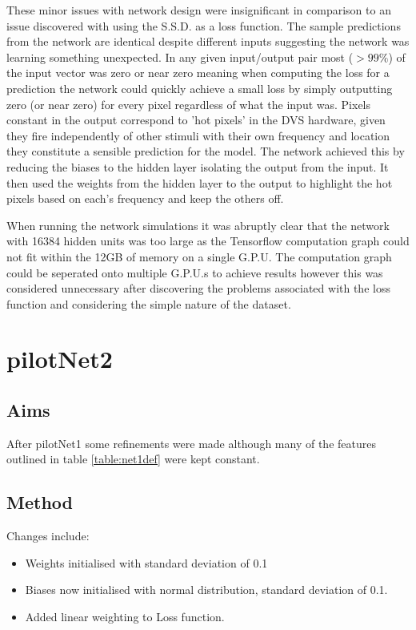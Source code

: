 These minor issues with network design were insignificant in comparison to an issue discovered with using the S.S.D. as a loss function. 
The sample predictions from the network are identical despite different inputs suggesting the network was learning something unexpected.
In any given input/output pair most ($>99\%$) of the input vector was zero or near zero meaning when computing the loss for a prediction the network could quickly achieve a small loss by simply outputting zero (or near zero) for every pixel regardless of what the input was. 
Pixels constant in the output correspond to 'hot pixels' in the DVS hardware, given they fire independently of other stimuli with their own frequency and location they constitute a sensible prediction for the model. 
The network achieved this by reducing the biases to the hidden layer isolating the output from the input.
It then used the weights from the hidden layer to the output to highlight the hot pixels based on each's frequency and keep the others off. 


When running the network simulations it was abruptly clear that the network with 16384 hidden units was too large as the Tensorflow computation graph could not fit within the 12GB of memory on a single G.P.U.
The computation graph could be seperated onto multiple G.P.U.s to achieve results however this was considered unnecessary after discovering the problems associated with the loss function and considering the simple nature of the dataset.




\section{pilotNet2}

\subsection{Aims}

After pilotNet1 some refinements were made although many of the features outlined in table \ref{table:net1def} were kept constant. 

\subsection{Method}
Changes include:
\begin{itemize}
    \itemsep-0.5em
    \item Weights initialised with standard deviation of 0.1
    \item Biases now initialised with normal distribution, standard deviation of 0.1.
    \item Added linear weighting to Loss function.
\end{itemize}


